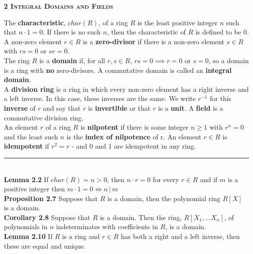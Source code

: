 \documentclass[a4paper]{article}
\begin{document}
\begin{framed}
	\begin{center}
		\textbf{\textsc{2 Integral Domains and Fields}}
	\end{center}
	The \textbf{characteristic}, $char(R)$, of a ring $R$ is the least positive integer $n$ such that $n \cdot 1 = 0$. If there is no such $n$, then the characteristic of $R$ is defined to be 0.\\
	
	\noindent
	A non-zero element $r \in R$ is a \textbf{zero-divisor} if there is a non-zero element $s \in R$ with $rs = 0$ or $sr = 0$.\\
	
	\noindent
	The ring $R$ is a \textbf{domain} if, for all $r, s \in R$, $rs = 0 \implies r = 0$ or $s = 0$, so a domain is a ring with \textbf{no} zero-divisors. A commutative domain is called an \textbf{integral domain}.\\
	
	\noindent
	A \textbf{division ring} is a ring in which every non-zero element has a right inverse and a left inverse. In this case, these inverses are the same. We write $r^{-1}$ for this \textbf{inverse} of $r$ and say that $r$ is \textbf{invertible} or that $r$ is a \textbf{unit}. A \textbf{field} is a commutative division ring.\\
	
	\noindent
	An element $r$ of a ring $R$ is \textbf{nilpotent} if there is some integer $n \geq 1$ with $r^n = 0$ and the least such $n$ is the \textbf{index of nilpotence} of r. An element $r \in R$ is \textbf{idempotent} if $r^2 = r$ - and 0 and 1 are idempotent in any ring.
	
	\noindent\rule{\textwidth}{0.5pt}\\
	
	\noindent
	\textbf{Lemma 2.2} If $char(R) = n > 0$, then
	$n \cdot r = 0$ for every $r \in R$ and if $m$ is a positive integer then $m \cdot 1 = 0 \iff n \, \vert \, m$\\
	
	\noindent
	\textbf{Proposition 2.7} Suppose that $R$ is a domain, then the polynomial ring $R[X]$ is a domain.\\
	
	\noindent
	\textbf{Corollary 2.8} Suppose that $R$ is a domain. Then the ring, $R[X_1, \dots X_n]$, of polynomials in $n$ indeterminates with coefficients in $R$, is a domain.\\
	
	\noindent
	\textbf{Lemma 2.10} If $R$ is a ring and $r \in R$ has both a right and a left inverse, then these are equal and unique.\\
	

\end{framed}
\end{document}
